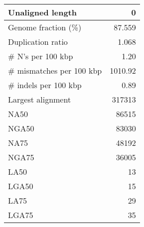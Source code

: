 \documentclass[12pt,a4paper]{article}
\begin{document}
\begin{table}[ht]
\begin{center}
\begin{tabular}{|l*{1}{|r}|}
Unaligned length & 0 \\ \hline
Genome fraction (\%) & 87.559 \\ \hline
Duplication ratio & 1.068 \\ \hline
\# N's per 100 kbp & 1.20 \\ \hline
\# mismatches per 100 kbp & 1010.92 \\ \hline
\# indels per 100 kbp & 0.89 \\ \hline
Largest alignment & 317313 \\ \hline
NA50 & 86515 \\ \hline
NGA50 & 83030 \\ \hline
NA75 & 48192 \\ \hline
NGA75 & 36005 \\ \hline
LA50 & 13 \\ \hline
LGA50 & 15 \\ \hline
LA75 & 29 \\ \hline
LGA75 & 35 \\ \hline
\end{tabular}
\end{center}
\end{table}
\end{document}
